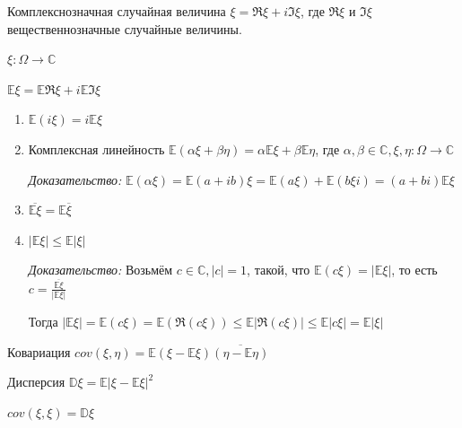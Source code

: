 
\begin{definition}
    Комплекснозначная случайная величина $\xi = \Re \xi + i \Im \xi$, где $\Re \xi$ и $\Im \xi$ 
    вещественнозначные случайные величины.
\end{definition}

\begin{definition}
    $\xi : \Omega \to \mathbb{C}$

    $\mathbb{E} \xi = \mathbb{E} \Re \xi + i \mathbb{E} \Im \xi$
\end{definition}

\begin{properties}
    \begin{enumerate}
        \item {
            $\mathbb{E} (i \xi) = i \mathbb{E}\xi$
        }
        \item {
            Комплексная линейность $\mathbb{E} (\alpha \xi + \beta \eta) = \alpha \mathbb{E} \xi + \beta \mathbb{E} \eta$, где $\alpha, \beta \in \mathbb{C}, \xi, \eta : \Omega \to \mathbb{C}$

            \textit{Доказательство: } $\mathbb{E} (\alpha \xi) = \mathbb{E} (a + ib)\xi = \mathbb{E} (a \xi) + \mathbb{E} (b\xi i) = (a + bi) \mathbb{E} \xi$
        }
        \item {
            $\overline{\mathbb{E} \xi} = \mathbb{E} \overline{\xi}$
        }
        \item {
            $|\mathbb{E} \xi | \leqslant \mathbb{E} |\xi|$

            \textit{Доказательство: } Возьмём $c \in \mathbb{C}, |c| = 1$, такой, что $\mathbb{E} (c \xi) = |\mathbb{E} \xi|$, то есть $c = \frac{\overline{\mathbb{E} \xi}}{|\mathbb{E} \xi|}$

            Тогда $|\mathbb{E} \xi| = \mathbb{E} (c \xi) = \mathbb{E} (\Re (c \xi)) \leqslant \mathbb{E} |\Re (c \xi)| \leqslant \mathbb{E} |c \xi | = \mathbb{E} |\xi|$
        }
    \end{enumerate}
\end{properties}

\begin{definition}
    Ковариация $cov(\xi, \eta) = \mathbb{E} (\xi - \mathbb{E}\xi)\overline{(\eta - \mathbb{E} \eta)}$
\end{definition}

\begin{definition}
    Дисперсия $\mathbb{D} \xi = \mathbb{E} |\xi - \mathbb{E}\xi|^2$

    $cov(\xi, \xi) = \mathbb{D}\xi$
\end{definition}

